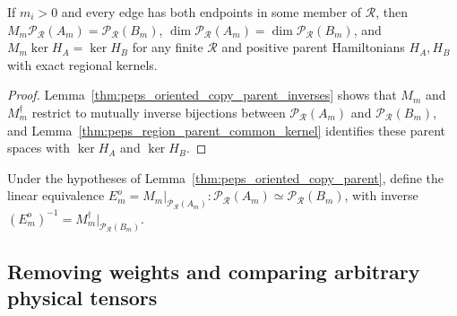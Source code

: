 \begin{lemma}%
    \label{thm:peps_oriented_copy_parent}
    \leanok
    If $m_i>0$ and every edge has both endpoints in some member of $\mathcal R$, then $M_m\mathcal P_{\mathcal R}(A_m)=\mathcal P_{\mathcal R}(B_m)$, $\dim\mathcal P_{\mathcal R}(A_m)=\dim\mathcal P_{\mathcal R}(B_m)$, and $M_m\ker H_A=\ker H_B$ for any finite $\mathcal R$ and positive parent Hamiltonians $H_A,H_B$ with exact regional kernels.
\end{lemma}
\begin{proof}\leanok
    Lemma~\ref{thm:peps_oriented_copy_parent_inverses} shows that $M_m$ and $M_m^\dagger$ restrict to mutually inverse bijections between $\mathcal P_{\mathcal R}(A_m)$ and $\mathcal P_{\mathcal R}(B_m)$, and Lemma~\ref{thm:peps_region_parent_common_kernel} identifies these parent spaces with $\ker H_A$ and $\ker H_B$.
\end{proof}

\begin{definition}%
    \label{def:peps_oriented_copy_parent_equivalence}
    \leanok
    Under the hypotheses of Lemma~\ref{thm:peps_oriented_copy_parent}, define the linear equivalence $E_m^o=M_m|_{\mathcal P_{\mathcal R}(A_m)}:\mathcal P_{\mathcal R}(A_m)\simeq\mathcal P_{\mathcal R}(B_m)$, with inverse $(E_m^o)^{-1}=M_m^\dagger|_{\mathcal P_{\mathcal R}(B_m)}$.
\end{definition}

\subsection{Removing weights and comparing arbitrary physical tensors}

